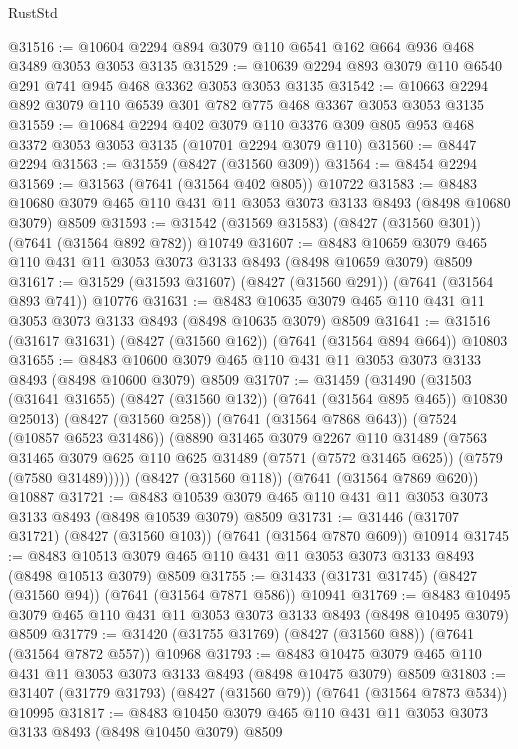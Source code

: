 \begin{lexlean}{RustStd}
\begin{coremodule}
{\begin{coremodule}
{{{{{{{{{{{{{{{{{{{{{{{{{{{{{{{{@31516 := @10604 @2294 @894 @3079 @110 @6541 @162 @664 @936 @468 @3489 @3053 @3053 @3135
@31529 := @10639 @2294 @893 @3079 @110 @6540 @291 @741 @945 @468 @3362 @3053 @3053 @3135
@31542 := @10663 @2294 @892 @3079 @110 @6539 @301 @782 @775 @468 @3367 @3053 @3053 @3135
@31559 := @10684
    @2294
    @402
    @3079
    @110
    @3376
    @309
    @805
    @953
    @468
    @3372
    @3053
    @3053
    @3135
    (@10701 @2294 @3079 @110)
@31560 := @8447 @2294
@31563 := @31559 (@8427 (@31560 @309))
@31564 := @8454 @2294
@31569 := @31563 (@7641 (@31564 @402 @805)) @10722
@31583 := @8483 @10680 @3079 @465 @110 @431 @11 @3053 @3073 @3133 @8493 (@8498 @10680 @3079) @8509
@31593 := @31542 (@31569 @31583) (@8427 (@31560 @301)) (@7641 (@31564 @892 @782)) @10749
@31607 := @8483 @10659 @3079 @465 @110 @431 @11 @3053 @3073 @3133 @8493 (@8498 @10659 @3079) @8509
@31617 := @31529 (@31593 @31607) (@8427 (@31560 @291)) (@7641 (@31564 @893 @741)) @10776
@31631 := @8483 @10635 @3079 @465 @110 @431 @11 @3053 @3073 @3133 @8493 (@8498 @10635 @3079) @8509
@31641 := @31516 (@31617 @31631) (@8427 (@31560 @162)) (@7641 (@31564 @894 @664)) @10803
@31655 := @8483 @10600 @3079 @465 @110 @431 @11 @3053 @3073 @3133 @8493 (@8498 @10600 @3079) @8509
@31707 := @31459
    (@31490
      (@31503 (@31641 @31655) (@8427 (@31560 @132)) (@7641 (@31564 @895 @465)) @10830 @25013)
      (@8427 (@31560 @258))
      (@7641 (@31564 @7868 @643))
      (@7524 (@10857 @6523 @31486))
      (@8890
        @31465
        @3079
        @2267
        @110
        @31489
        (@7563
          @31465
          @3079
          @625
          @110
          @625
          @31489
          (@7571 (@7572 @31465 @625))
          (@7579 (@7580 @31489)))))
    (@8427 (@31560 @118))
    (@7641 (@31564 @7869 @620))
    @10887
@31721 := @8483 @10539 @3079 @465 @110 @431 @11 @3053 @3073 @3133 @8493 (@8498 @10539 @3079) @8509
@31731 := @31446 (@31707 @31721) (@8427 (@31560 @103)) (@7641 (@31564 @7870 @609)) @10914
@31745 := @8483 @10513 @3079 @465 @110 @431 @11 @3053 @3073 @3133 @8493 (@8498 @10513 @3079) @8509
@31755 := @31433 (@31731 @31745) (@8427 (@31560 @94)) (@7641 (@31564 @7871 @586)) @10941
@31769 := @8483 @10495 @3079 @465 @110 @431 @11 @3053 @3073 @3133 @8493 (@8498 @10495 @3079) @8509
@31779 := @31420 (@31755 @31769) (@8427 (@31560 @88)) (@7641 (@31564 @7872 @557)) @10968
@31793 := @8483 @10475 @3079 @465 @110 @431 @11 @3053 @3073 @3133 @8493 (@8498 @10475 @3079) @8509
@31803 := @31407 (@31779 @31793) (@8427 (@31560 @79)) (@7641 (@31564 @7873 @534)) @10995
@31817 := @8483 @10450 @3079 @465 @110 @431 @11 @3053 @3073 @3133 @8493 (@8498 @10450 @3079) @8509
}}}}}}}}}}}}}}}}}}}}}}}}}}}}}}}}
\end{coremodule}}
\end{coremodule}
\end{lexlean}
